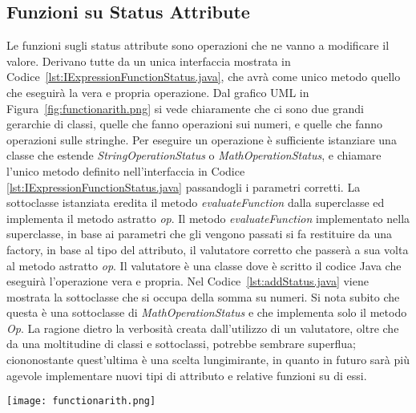 \subsection{Funzioni su Status Attribute}
\label{sub:funzioni_status_attribute}
Le funzioni sugli status attribute sono operazioni che ne vanno a modificare il valore. Derivano tutte da un unica interfaccia mostrata in Codice~\ref{lst:IExpressionFunctionStatus.java}, che avrà come unico metodo quello che eseguirà la vera e propria operazione.
Dal grafico UML in Figura~\ref{fig:functionarith.png} si vede chiaramente che ci sono due grandi gerarchie di classi, quelle che fanno operazioni sui numeri, e quelle che fanno operazioni sulle stringhe.
Per eseguire un operazione è sufficiente istanziare una classe che estende \textit{StringOperationStatus} o \textit{MathOperationStatus}, e chiamare l'unico metodo definito nell'interfaccia in Codice \ref{lst:IExpressionFunctionStatus.java} passandogli i parametri corretti. La sottoclasse istanziata eredita il metodo \textit{evaluateFunction} dalla superclasse ed implementa il metodo astratto \textit{op}. Il metodo \textit{evaluateFunction} implementato nella superclasse, in base ai parametri che gli vengono passati si fa restituire da una factory, in base al tipo del attributo, il valutatore corretto che passerà a sua volta al metodo astratto \textit{op}. Il valutatore è una classe dove è scritto il codice Java che eseguirà l'operazione vera e propria.
Nel Codice~\ref{lst:addStatus.java} viene mostrata la sottoclasse che si occupa della somma su numeri. Si nota subito che questa è una sottoclasse di \textit{MathOperationStatus} e che implementa solo il metodo \textit{Op}.
La ragione dietro la verbosità creata dall'utilizzo di un valutatore, oltre che da una moltitudine di classi e sottoclassi, potrebbe sembrare superflua; ciononostante quest'ultima è una scelta lungimirante, in quanto in futuro sarà più agevole implementare nuovi tipi di attributo e relative funzioni su di essi.

\begin{sidewaysfigure}
    \centering
	\texttt{[image: functionarith.png]}
    \caption{Grafico UML per la gerarchia di funzioni aritmetiche}
    \label{fig:functionarith.png}
\end{sidewaysfigure}


